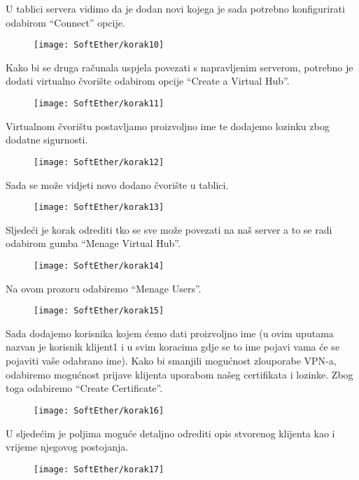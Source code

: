 \FloatBarrier
U tablici servera vidimo da je dodan novi kojega je sada potrebno konfigurirati odabirom ``Connect'' opcije.
\begin{figure}[h!]
     \centering
     \texttt{[image: SoftEther/korak10]}
\end{figure}
\FloatBarrier
Kako bi se druga računala uspjela povezati s napravljenim serverom, potrebno je dodati virtualno čvorište odabirom opcije ``Create a Virtual Hub''.
\begin{figure}[h!]
     \centering
     \texttt{[image: SoftEther/korak11]}
\end{figure}
\FloatBarrier
Virtualnom čvorištu postavljamo proizvoljno ime te dodajemo lozinku zbog dodatne sigurnosti.
\begin{figure}[h!]
     \centering
     \texttt{[image: SoftEther/korak12]}
\end{figure}
\FloatBarrier
Sada se može vidjeti novo dodano čvorište u tablici.
\begin{figure}[h!]
     \centering
     \texttt{[image: SoftEther/korak13]}
\end{figure}
\FloatBarrier
Sljedeći je korak odrediti tko se sve može povezati na naš server a to se radi odabirom gumba ``Menage Virtual Hub''.
\begin{figure}[h!]
     \centering
     \texttt{[image: SoftEther/korak14]}
\end{figure}
\FloatBarrier
Na ovom prozoru odabiremo ``Menage Users''.
\begin{figure}[h!]
     \centering
     \texttt{[image: SoftEther/korak15]}
\end{figure}
\FloatBarrier
Sada dodajemo korisnika kojem ćemo dati proizvoljno ime (u ovim uputama nazvan je korisnik klijent1 i u svim koracima gdje se to ime pojavi vama će se pojaviti vaše odabrano ime). Kako bi smanjili mogućnost zlouporabe VPN-a, odabiremo mogućnost prijave klijenta uporabom našeg certifikata i lozinke. Zbog toga odabiremo ``Create Certificate''.
\begin{figure}[h!]
     \centering
     \texttt{[image: SoftEther/korak16]}
\end{figure}
\FloatBarrier
U sljedećim je poljima moguće detaljno odrediti opis stvorenog klijenta kao i vrijeme njegovog postojanja.
\begin{figure}[h!]
     \centering
     \texttt{[image: SoftEther/korak17]}
\end{figure}
